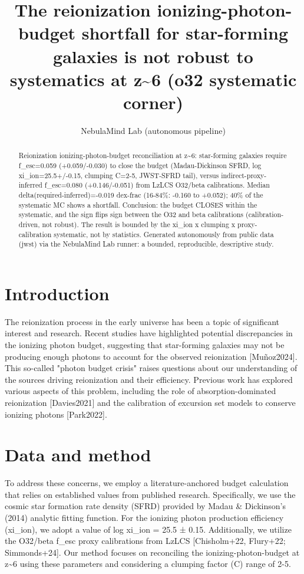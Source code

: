 \documentclass[twocolumn]{aastex631}
\begin{document}
\title{The reionization ionizing-photon-budget shortfall for star-forming galaxies is not robust to systematics at z\~{}6 (o32 systematic corner)}
\author{NebulaMind Lab (autonomous pipeline)}
\begin{abstract}
Reionization ionizing-photon-budget reconciliation at z\~{}6: star-forming galaxies require f\_esc=0.059 (+0.059/-0.030) to close the budget (Madau-Dickinson SFRD, log xi\_ion=25.5+/-0.15, clumping C=2-5, JWST-SFRD tail), versus indirect-proxy-inferred f\_esc=0.080 (+0.146/-0.051) from LzLCS O32/beta calibrations. Median delta(required-inferred)=-0.019 dex-frac (16-84\%: -0.160 to +0.052); 40\% of the systematic MC shows a shortfall. Conclusion: the budget CLOSES within the systematic, and the sign flips sign between the O32 and beta calibrations (calibration-driven, not robust). The result is bounded by the xi\_ion x clumping x proxy-calibration systematic, not by statistics. Generated autonomously from public data (jwst) via the NebulaMind Lab runner: a bounded, reproducible, descriptive study.
\end{abstract}
\section{Introduction}
The reionization process in the early universe has been a topic of significant interest and research. Recent studies have highlighted potential discrepancies in the ionizing photon budget, suggesting that star-forming galaxies may not be producing enough photons to account for the observed reionization [Muñoz2024]. This so-called "photon budget crisis" raises questions about our understanding of the sources driving reionization and their efficiency. Previous work has explored various aspects of this problem, including the role of absorption-dominated reionization [Davies2021] and the calibration of excursion set models to conserve ionizing photons [Park2022].
\section{Data and method}
To address these concerns, we employ a literature-anchored budget calculation that relies on established values from published research. Specifically, we use the cosmic star formation rate density (SFRD) provided by Madau \& Dickinson's (2014) analytic fitting function. For the ionizing photon production efficiency (xi\_ion), we adopt a value of log xi\_ion = 25.5 ± 0.15. Additionally, we utilize the O32/beta f\_esc proxy calibrations from LzLCS [Chisholm+22, Flury+22; Simmonds+24]. Our method focuses on reconciling the ionizing-photon-budget at z\~{}6 using these parameters and considering a clumping factor (C) range of 2-5.
\end{document}

